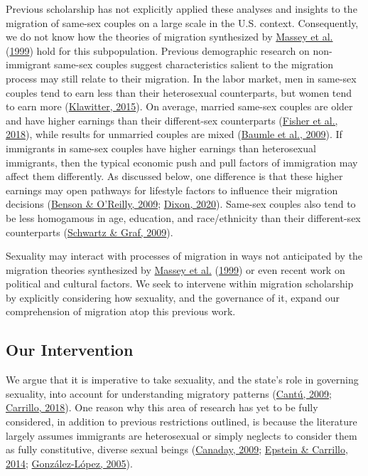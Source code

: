 \documentclass[
  11pt,
]{article}
\begin{document}
Previous scholarship has not explicitly applied these analyses and insights to the migration of same-sex couples on a large scale in the U.S. context. Consequently, we do not know how the theories of migration synthesized by \protect\hyperlink{ref-massey_1999}{Massey et al.} (\protect\hyperlink{ref-massey_1999}{1999}) hold for this subpopulation. Previous demographic research on non-immigrant same-sex couples suggest characteristics salient to the migration process may still relate to their migration. In the labor market, men in same-sex couples tend to earn less than their heterosexual counterparts, but women tend to earn more (\protect\hyperlink{ref-klawitter_2015}{Klawitter, 2015}). On average, married same-sex couples are older and have higher earnings than their different-sex counterparts (\protect\hyperlink{ref-fisher_2018}{Fisher et al., 2018}), while results for unmarried couples are mixed (\protect\hyperlink{ref-baumle_2009}{Baumle et al., 2009}). If immigrants in same-sex couples have higher earnings than heterosexual immigrants, then the typical economic push and pull factors of immigration may affect them differently. As discussed below, one difference is that these higher earnings may open pathways for lifestyle factors to influence their migration decisions (\protect\hyperlink{ref-benson_2009}{Benson \& O'Reilly, 2009}; \protect\hyperlink{ref-dixon_2020}{Dixon, 2020}). Same-sex couples also tend to be less homogamous in age, education, and race/ethnicity than their different-sex counterparts (\protect\hyperlink{ref-schwartz_2009}{Schwartz \& Graf, 2009}).

Sexuality may interact with processes of migration in ways not anticipated by the migration theories synthesized by \protect\hyperlink{ref-massey_1999}{Massey et al.} (\protect\hyperlink{ref-massey_1999}{1999}) or even recent work on political and cultural factors. We seek to intervene within migration scholarship by explicitly considering how sexuality, and the governance of it, expand our comprehension of migration atop this previous work.

\hypertarget{our-intervention}{%
\subsection{Our Intervention}\label{our-intervention}}

We argue that it is imperative to take sexuality, and the state's role in governing sexuality, into account for understanding migratory patterns (\protect\hyperlink{ref-cantu_2009}{Cantú, 2009}; \protect\hyperlink{ref-carrillo_2018}{Carrillo, 2018}). One reason why this area of research has yet to be fully considered, in addition to previous restrictions outlined, is because the literature largely assumes immigrants are heterosexual or simply neglects to consider them as fully constitutive, diverse sexual beings (\protect\hyperlink{ref-canaday_2009}{Canaday, 2009}; \protect\hyperlink{ref-epstein_2014}{Epstein \& Carrillo, 2014}; \protect\hyperlink{ref-gonzalez-lopez_2005}{González-López, 2005}).
\end{document}
